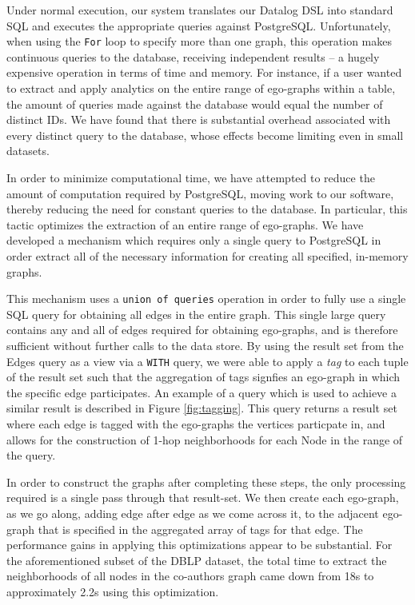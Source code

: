 \documentclass[11pt,letterpaper]{article}
\begin{document}
Under normal execution, our system translates our Datalog DSL into standard SQL and executes the appropriate queries against PostgreSQL. Unfortunately, when using the \texttt{For} loop to specify more than one graph, this operation makes continuous queries to the database, receiving independent results -- a hugely expensive operation in terms of time and memory. For instance, if a user wanted to extract and apply analytics on the entire range of ego-graphs within a table, the amount of queries made against the database would equal the number of distinct IDs. We have found that there is substantial overhead associated with every distinct query to the database, whose effects become limiting even in small datasets.

In order to minimize computational time, we have attempted to reduce the amount of computation required by PostgreSQL, moving work to our software, thereby reducing the need for constant queries to the database. In particular, this tactic optimizes the extraction of an entire range of ego-graphs. We have developed a mechanism which requires only a single query to PostgreSQL in order extract all of the necessary information for creating all specified, in-memory graphs.

This mechanism uses a \texttt{union of queries} operation in order to fully use a single SQL query for obtaining all edges in the entire graph. This single large query contains any and all of edges required for obtaining ego-graphs, and is therefore sufficient without further calls to the data store. By using the result set from the Edges query as a view via a \texttt{WITH} query, we were able to apply a \textit{tag} to each tuple of the result set such that the aggregation of tags signfies an ego-graph in which the specific edge participates. An example of a query which is used to achieve a similar result is described in Figure \ref{fig:tagging}. This query returns a result set where each edge is tagged with the ego-graphs the vertices particpate in, and allows for the construction of 1-hop neighborhoods for each Node in the range of the query.

In order to construct the graphs after completing these steps, the only processing required is a single pass through that result-set. We then create each ego-graph, as we go along, adding edge after edge as we come across it, to the adjacent ego-graph that is specified in the aggregated array of tags for that edge. The performance gains in applying this optimizations appear to be substantial. For the aforementioned subset of the DBLP dataset, the total time to extract the neighborhoods of all nodes in the co-authors graph came down from 18s to approximately 2.2s using this optimization.
\end{document}
